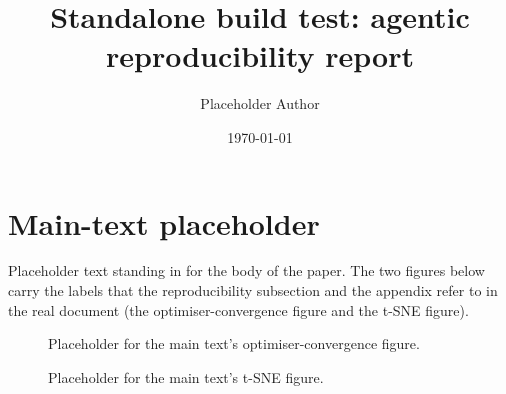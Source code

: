 \documentclass[aps,prx,twocolumn,a4paper]{revtex4-2}
\begin{document}
\title{Standalone build test: agentic reproducibility report}
\author{Placeholder Author}
\date{\today}
\maketitle

\section{Main-text placeholder}

Placeholder text standing in for the body of the paper.  The two figures below
carry the labels that the reproducibility subsection and the appendix refer to
in the real document (the optimiser-convergence figure and the t-SNE figure).

\begin{figure}[b]
\caption{Placeholder for the main text's optimiser-convergence figure.}
\label{fig:OptConv}
\end{figure}

\begin{figure}[b]
\caption{Placeholder for the main text's t-SNE figure.}
\label{fig:tsne}
\end{figure}






\appendix

\end{document}
